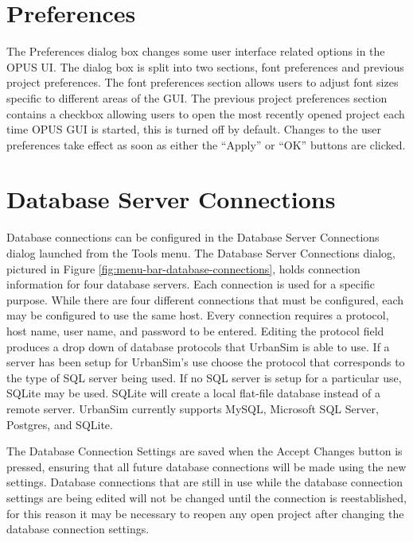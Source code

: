 \section{Preferences}

The Preferences dialog box changes some user interface related options in
the OPUS UI.  The dialog box is split into two sections, font preferences
and previous project preferences.  The font preferences section allows
users to adjust font sizes specific to different areas of the GUI.  The
previous project preferences section contains a checkbox allowing users to
open the most recently opened project each time OPUS GUI is started, this
is turned off by default.  Changes to the user preferences take effect as
soon as either the ``Apply'' or ``OK'' buttons are clicked.

\section{Database Server Connections}\label{sec:database-server-connections}

Database connections can be configured in the Database Server Connections
dialog launched from the Tools menu.  The Database Server Connections
dialog, pictured in Figure \ref{fig:menu-bar-database-connections}, holds
connection information for four database servers.  Each connection is used
for a specific purpose.  While there are four different connections that
must be configured, each may be configured to use the same host.  Every
connection requires a protocol, host name, user name, and password to be
entered.  Editing the protocol field produces a drop down of database
protocols that UrbanSim is able to use.  If a server has been setup for
UrbanSim's use choose the protocol that corresponds to the type of SQL
server being used.  If no SQL server is setup for a particular use, SQLite
may be used.  SQLite will create a local flat-file database instead of a
remote server.  UrbanSim currently supports MySQL, Microsoft SQL Server,
Postgres, and SQLite.

The Database Connection Settings are saved when the Accept Changes button
is pressed, ensuring that all future database connections will be made
using the new settings.  Database connections that are still in use while
the database connection settings are being edited will not be changed until
the connection is reestablished, for this reason it may be necessary to
reopen any open project after changing the database connection settings.

